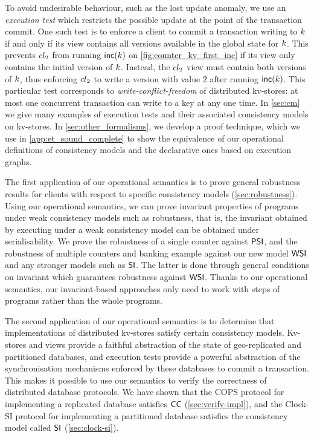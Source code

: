 To avoid undesirable behaviour, such as the lost update anomaly, we
use an {\em execution test} which restricts the possible update at the
point of the transaction commit.  One such test is to enforce a client
to commit a transaction writing to $k$ if and only if its view
contains all versions available in the global state for $k$.  This
prevents ${cl}_2$ from running $\mathsf{inc}(k)$ on
\cref{fig:counter_kv_first_inc} if its view only contains the initial
version of $k$.  Instead, the ${cl}_2$ view must contain both
versions of $k$, thus enforcing ${cl}_2$ to write a version with
value $2$ after running $\mathsf{inc}(k)$. This particular test
corresponds to \emph{write-conflict-freedom} of distributed kv-stores:
at most one concurrent transaction can write to a key at any one time.
In \cref{sec:cm} we give many examples of execution tests and their
associated consistency models on kv-stores. In \cref{sec:other_formalisms}, we
develop a proof technique, which we use in \cref{app:et_sound_complete} 
to show the equivalence of our operational definitions of consistency models and the 
declarative ones based on  
execution graphs. 

The first application of our operational semantics is to prove
general robustness results for clients with respect to specific
consistency models (\cref{sec:robustness}). 
Using our operational semantics, we can prove invariant properties
of programs under weak consistency models
such as robustness,
that is, the invariant obtained by executing under a weak consistency model can
be obtained under serialisability.
We prove the robustness of a single
counter against $\mathsf{PSI}$, and the robustness of multiple counters and banking example \cite{bank-example-wsi}
against our new model $\mathsf{WSI}$ and any stronger models such as $\mathsf{SI}$.
The latter is done through general conditions on invariant which guarantees robustness against \( \mathsf{WSI} \).
Thanks to our operational semantics, our invariant-based approaches only need to work with steps of programs rather than the whole programs.

The second application of our operational
semantics is to determine that implementations of distributed
kv-stores satisfy certain consistency models. 
Kv-stores and views provide a 
faithful abstraction of the state of geo-replicated and partitioned
databases, and  execution tests provide a powerful abstraction of the synchronisation mechanisms 
enforced by these databases to commit a transaction. This makes it
possible to use our 
semantics to verify the correctness of distributed database protocols. 
We have shown that the
COPS protocol \citep{cops} for implementing a replicated database satisfies \( \mathsf{CC} \)  (\cref{sec:verify-impl}), 
and the Clock-SI protocol \citep{clocksi} for implementing a
partitioned database satisfies the consistency model called $\mathsf{SI}$ (\cref{sec:clock-si}). 


